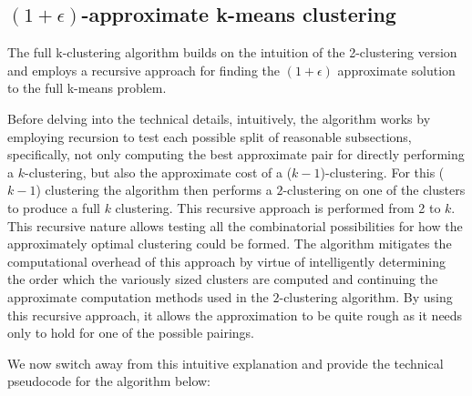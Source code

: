 \subsection{$(1+\epsilon)$-approximate k-means clustering}

The full k-clustering algorithm builds on the intuition of the 2-clustering version and employs a recursive approach for finding the $(1+\epsilon)$ approximate solution to the full k-means problem.

Before delving into the technical details, intuitively, the algorithm works by employing recursion to test each possible split of
reasonable subsections, specifically, not only computing the best approximate pair for
directly performing a $k$-clustering, but also the approximate cost of a ($k-1$)-clustering.
For this ($k-1$) clustering the algorithm then performs a $2$-clustering on one
of the clusters to produce a full $k$ clustering. This recursive approach is
performed from 2 to $k$. This recursive nature allows testing all the combinatorial possibilities
for how the approximately optimal clustering could be formed. The algorithm mitigates
the computational overhead of this approach by virtue of intelligently determining
the order which the variously sized clusters are computed and continuing the
approximate computation methods used in the $2$-clustering algorithm. By using
this recursive approach, it allows the approximation to be quite rough as it needs only
to hold for one of the possible pairings.

We now switch away from this intuitive explanation and provide the technical
pseudocode for the algorithm below:

